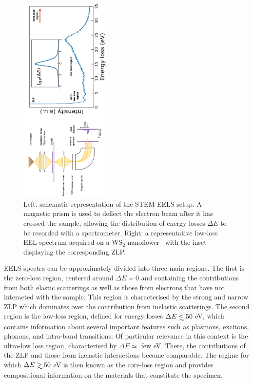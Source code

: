 \begin{figure}[t]
  \centering
  \includegraphics[width=0.40\textwidth,angle=-90]{plots/EELS.pdf}
  \caption{Left: schematic representation of the STEM-EELS setup.
    A magnetic
    prism is used to deflect the electron beam after it has crossed the sample,
   allowing the distribution of energy losses $\Delta E$ to be recorded
    with a spectrometer.
    Right: a representative low-loss EEL spectrum acquired 
    on a WS$_2$ nanoflower~\cite{SabryaWS2} with
    the inset displaying the corresponding ZLP.
  }
  \label{fig:EELS}
\end{figure}

EELS spectra can be approximately divided into three main regions.
%
The first is the zero-loss region, centered around $\Delta E=0$
and containing the contributions from both elastic scatterings
as well as those from electrons that have not interacted with the
sample.
%
This region is characterised by the strong and narrow ZLP
which dominates over the contribution
from inelastic scatterings.
%
The second region is the low-loss region, defined for energy losses
$\Delta E \lsim 50$ eV, which contains information
about several important features such as plasmons, excitons, phonons, and
intra-band transitions.
%
Of particular relevance in this context is the ultra-low loss region, characterised by $\Delta E \simeq$ few eV.
%
There, the contributions of the ZLP and those from inelastic interactions
become comparable.
%
The regime for which $\Delta E \gsim 50$ eV is then known as the core-loss region and
provides compositional information
on the materials that constitute the specimen.

